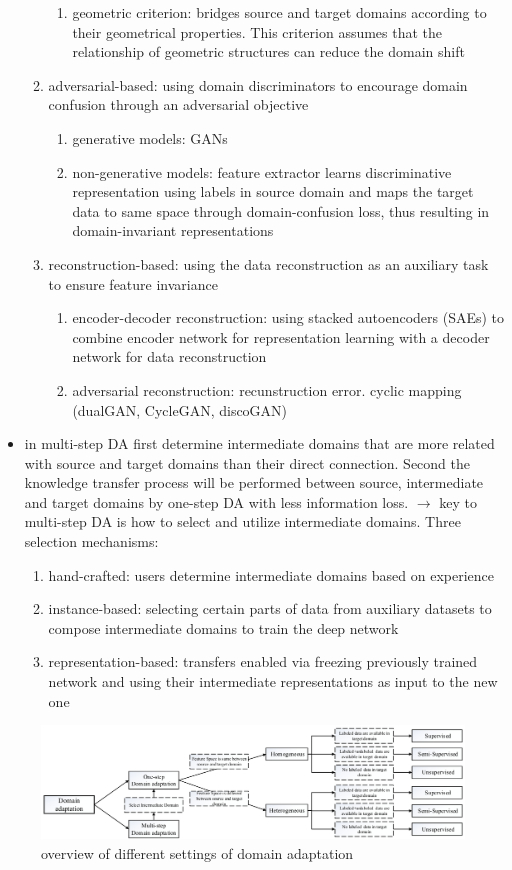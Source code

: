 \documentclass[]{article}
\begin{document}
\begin{itemize}
\begin{enumerate}
\begin{enumerate}
			\item geometric criterion: bridges source and target domains according to their geometrical properties. This criterion assumes that the relationship of geometric structures can reduce the domain shift
		\end{enumerate}
		\item adversarial-based: using domain discriminators to encourage domain confusion through an adversarial objective
		\begin{enumerate}
			\item generative models: GANs
			\item non-generative models: feature extractor learns discriminative representation using labels in source domain and maps the target data to same space through domain-confusion loss, thus resulting in domain-invariant representations
		\end{enumerate}
		\item reconstruction-based: using the data reconstruction as an auxiliary task to ensure feature invariance
		\begin{enumerate}
			\item encoder-decoder reconstruction: using stacked autoencoders (SAEs) to combine encoder network for representation learning with a decoder network for data reconstruction
			\item adversarial reconstruction: recunstruction error. cyclic mapping (dualGAN, CycleGAN, discoGAN)
		\end{enumerate}
	\end{enumerate}
	\item in multi-step DA first determine intermediate domains that are more related with source and target domains than their direct connection. Second the knowledge transfer process will be performed between source, intermediate and target domains by one-step DA with less information loss. $\rightarrow$ key to multi-step DA is how to select and utilize intermediate domains. Three selection mechanisms:
	\begin{enumerate}
		\item hand-crafted: users determine intermediate domains based on experience
		\item instance-based: selecting certain parts of data from auxiliary datasets to compose intermediate domains to train the deep network
		\item representation-based: transfers enabled via freezing previously trained network and using their intermediate representations as input to the new one
	\end{enumerate}
\end{itemize}

\begin{figure}
	\centering
	\includegraphics[width=\textwidth]{../images/overview_DA_settings.png}
	\caption{overview of different settings of domain adaptation}
	\label{fig:overview_DA_settings}
\end{figure}
\end{document}
